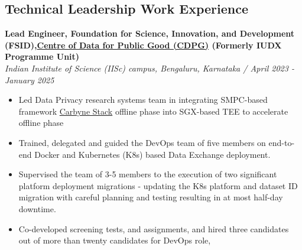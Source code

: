 \documentclass[a4paper,11pt]{article}
\begin{document}
\subsection*{Technical Leadership Work Experience} 
\textbf{Lead Engineer, Foundation for Science, Innovation, and Development (FSID),\href{https://dataforpublicgood.org.in/}{Centre of Data for Public Good (CDPG)} (Formerly IUDX Programme Unit)} \\
\textit{Indian Institute of Science (IISc) campus, Bengaluru, Karnataka / April 2023 - January 2025} 
\begin{itemize}
\item Led Data Privacy research systems team in integrating SMPC-based framework \href{https://carbynestack.io/}{Carbyne Stack} offline phase into SGX-based TEE to accelerate offline phase 
\item Trained, delegated and guided the DevOps team of five members on end-to-end Docker and Kubernetes (K8s) based  Data Exchange deployment.

\item Supervised the team of 3-5 members to the execution of two significant platform deployment migrations - updating the K8s platform and dataset ID migration with careful planning and testing resulting in at most half-day downtime.
\item Co-developed screening tests, and assignments, and hired three candidates out of more than twenty candidates for DevOps role, 
\end{itemize}
\end{document}
